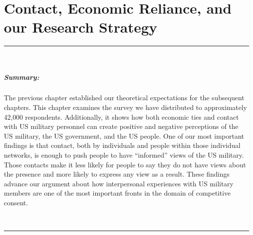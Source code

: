 \chapter{Contact, Economic Reliance, and our Research Strategy \label{cha:meth}}




\vspace*{-0.5cm}
\rule{\linewidth}{0.10pt} \\[-1cm]
{\footnotesize\paragraph{Summary:}  The previous chapter established our theoretical expectations for the subsequent chapters. This chapter examines the survey we have distributed to approximately 42,000 respondents. Additionally, it shows how both economic ties and contact with US military personnel can create positive and negative perceptions of the US military, the US government, and the US people. One of our most important findings is that contact, both by individuals and people within those individual networks, is enough to push people to have ``informed'' views of the US military. Those contacts make it less likely for people to say they do not have views about the presence and more likely to express any view as a result. These findings advance our argument about how interpersonal experiences with US military members are one of the most important fronts in the domain of competitive consent.} 
\\[-0.5cm] 
\rule{\linewidth}{0.10pt}

\vspace*{0.5cm}



